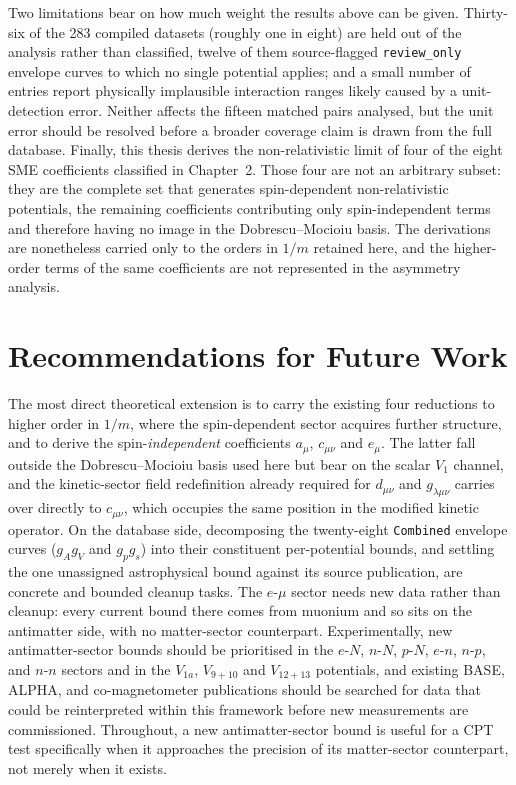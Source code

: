 Two limitations bear on how much weight the results above can be given.
Thirty-six of the
283 compiled datasets (roughly one in eight) are held out of the
analysis rather than classified, twelve of them source-flagged
\texttt{review\_only} envelope curves to which no single potential applies;
and a small number of entries report physically implausible interaction
ranges likely caused by a unit-detection error. Neither affects the fifteen
matched pairs analysed, but the unit error should be resolved before a
broader coverage claim is drawn from the full database. Finally,
this thesis derives the non-relativistic limit of four of the eight SME
coefficients classified in Chapter~2. Those four are not an arbitrary
subset: they are the complete set that generates spin-dependent
non-relativistic potentials, the remaining coefficients contributing only
spin-independent terms and therefore having no image in the
Dobrescu--Mocioiu basis. The derivations are nonetheless carried only to the
orders in $1/m$ retained here, and the higher-order terms of the same
coefficients are not represented in the asymmetry analysis.

\section{Recommendations for Future Work}

The most direct theoretical extension is to carry the existing four
reductions to higher order in $1/m$, where the spin-dependent sector
acquires further structure, and to derive the spin-\emph{independent}
coefficients $a_\mu$, $c_{\mu\nu}$ and $e_\mu$. The latter fall outside the
Dobrescu--Mocioiu basis used here but bear on the scalar $V_1$ channel, and
the kinetic-sector field redefinition already required for $d_{\mu\nu}$ and
$g_{\lambda\mu\nu}$ carries over directly to $c_{\mu\nu}$, which occupies
the same position in the modified kinetic operator. On the database side, decomposing the twenty-eight
\texttt{Combined} envelope curves ($g_Ag_V$ and $g_pg_s$) into their
constituent per-potential bounds, and settling the one unassigned
astrophysical bound against its source publication, are concrete and
bounded cleanup tasks. The $e$-$\mu$ sector needs new data rather than
cleanup: every current bound there comes from muonium and so sits on the
antimatter side, with no matter-sector counterpart. Experimentally, new
antimatter-sector bounds should be prioritised in the $e$-$N$, $n$-$N$,
$p$-$N$, $e$-$n$, $n$-$p$, and $n$-$n$ sectors and in the $V_{1a}$, $V_{9+10}$ and
$V_{12+13}$ potentials, and existing BASE, ALPHA, and co-magnetometer
publications should be searched for data that could be reinterpreted
within this framework before new measurements are commissioned. Throughout,
a new antimatter-sector bound is useful for a CPT test specifically when it
approaches the precision of its matter-sector counterpart, not merely when
it exists.

